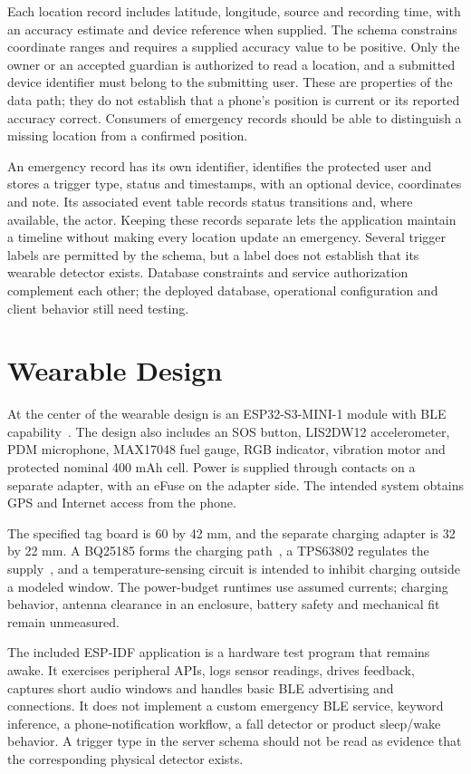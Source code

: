 \documentclass[nolineno]{ieeeaccess}
\begin{document}
Each location record includes latitude, longitude, source and recording time, with an accuracy estimate and device reference when supplied. The schema constrains coordinate ranges and requires a supplied accuracy value to be positive. Only the owner or an accepted guardian is authorized to read a location, and a submitted device identifier must belong to the submitting user. These are properties of the data path; they do not establish that a phone's position is current or its reported accuracy correct. Consumers of emergency records should be able to distinguish a missing location from a confirmed position.

An emergency record has its own identifier, identifies the protected user and stores a trigger type, status and timestamps, with an optional device, coordinates and note. Its associated event table records status transitions and, where available, the actor. Keeping these records separate lets the application maintain a timeline without making every location update an emergency. Several trigger labels are permitted by the schema, but a label does not establish that its wearable detector exists. Database constraints and service authorization complement each other; the deployed database, operational configuration and client behavior still need testing.

\section{Wearable Design}
At the center of the wearable design is an ESP32-S3-MINI-1 module with BLE capability~\cite{esp32}. The design also includes an SOS button, LIS2DW12 accelerometer, PDM microphone, MAX17048 fuel gauge, RGB indicator, vibration motor and protected nominal 400 mAh cell. Power is supplied through contacts on a separate adapter, with an eFuse on the adapter side. The intended system obtains GPS and Internet access from the phone.

The specified tag board is 60 by 42 mm, and the separate charging adapter is 32 by 22 mm. A BQ25185 forms the charging path~\cite{charger}, a TPS63802 regulates the supply~\cite{regulator}, and a temperature-sensing circuit is intended to inhibit charging outside a modeled window. The power-budget runtimes use assumed currents; charging behavior, antenna clearance in an enclosure, battery safety and mechanical fit remain unmeasured.

The included ESP-IDF application is a hardware test program that remains awake. It exercises peripheral APIs, logs sensor readings, drives feedback, captures short audio windows and handles basic BLE advertising and connections. It does not implement a custom emergency BLE service, keyword inference, a phone-notification workflow, a fall detector or product sleep/wake behavior. A trigger type in the server schema should not be read as evidence that the corresponding physical detector exists.
\end{document}

